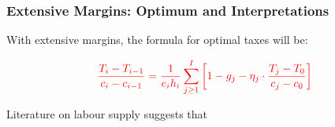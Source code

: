         \subsubsection{Extensive Margins: Optimum and Interpretations}

            With extensive margins, the formula for optimal taxes will be:
            
            \begin{equation}
                \color{red}
                \frac{T_i - T_{i-1}}{c_i - c_{i-1}} = \frac{1}{e_i h_i} \sum_{j\geq 1}^I \left[ 1 - g_j -\eta_j \cdot \frac{T_j - T_0}{c_j - c_0} \right]
            \end{equation}
            
            Literature on labour supply suggests that 

        